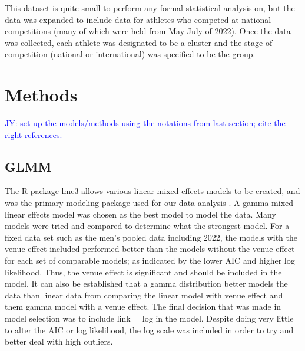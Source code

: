 \documentclass[12pt, letterpaper, titlepage]{article}
\newcommand{\jy}[1]{\textcolor{blue}{JY: #1}}
\begin{document}
This dataset is quite small to perform any formal statistical analysis on, but
the data was expanded to include data for athletes who competed at national
competitions (many of which were held from May-July of 2022).  Once the data
was collected, each athlete was designated to be a cluster and the stage of
competition (national or international) was specified to be the group. 

\section{Methods} \label{sec:Methods}

\jy{set up the models/methods using the notations from last section; cite the
  right references.}

\subsection{GLMM}
The R package lme3 allows various linear mixed effects models to be created, and 
was the primary modeling package used for our data analysis \citep{lme4}.
A gamma mixed linear effects model was chosen as the best model to model the data.
Many models were tried and compared to determine what the strongest model.  For
a fixed data set such as the men's pooled data including 2022, the models with
the venue effect included performed better than the models without the venue
effect for each set of comparable models; as indicated by the lower AIC and
higher log likelihood.  Thus, the venue effect is significant and should be
included in the model.  It can also be established that a gamma distribution
better models the data than linear data from comparing the linear model with
venue effect and them gamma model with a venue effect.  The final decision that
was made in model selection was to include link = log in the model.  Despite
doing very little to alter the AIC or log likelihood, the log scale was included
in order to try and better deal with high outliers. %
\end{document}
